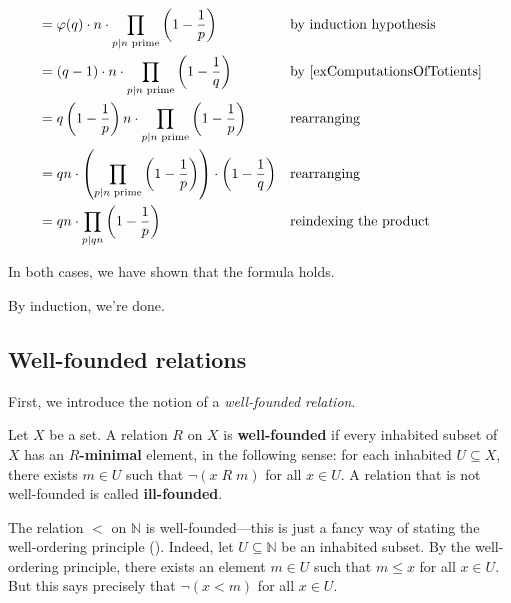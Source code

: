 \begin{cproof}
\begin{itemize}
\begin{itemize}
\begin{align*}
&= \varphi(q) \cdot n \cdot \prod_{p \mid n \text{ prime}} \left( 1-\frac{1}{p} \right) && \text{by induction hypothesis} \\
&= (q-1) \cdot n \cdot \prod_{p \mid n \text{ prime}} \left( 1-\frac{1}{q} \right) && \text{by \Cref{exComputationsOfTotients}} \\
&= q\left( 1-\frac{1}{p} \right) n \cdot \prod_{p \mid n \text{ prime}} \left( 1-\frac{1}{p} \right) && \text{rearranging} \\
&= qn \cdot \left(\prod_{p \mid n \text{ prime}} \left( 1 - \frac{1}{p} \right)\right) \cdot \left( 1 - \frac{1}{q} \right) && \text{rearranging} \\
&= qn \cdot \prod_{p \mid qn} \left( 1 - \frac{1}{p} \right) && \text{reindexing the product}
\end{align*}
\end{itemize}
In both cases, we have shown that the formula holds.
\end{itemize}
By induction, we're done.
\end{cproof}

\subsection*{Well-founded relations}

First, we introduce the notion of a \textit{well-founded relation}.

\begin{definition}
\label{defWellFoundedRelation}
Let $X$ be a set. A relation $R$ on $X$ is \textbf{well-founded} if every inhabited subset of $X$ has an \textbf{$R$-minimal} element, in the following sense: for each inhabited $U \subseteq X$, there exists $m \in U$ such that $\neg (x\;R\;m)$ for all $x \in U$. A relation that is not well-founded is called \textbf{ill-founded}.
\end{definition}

\begin{example}
\label{exNIsWellFounded}
The relation $<$ on $\mathbb{N}$ is well-founded---this is just a fancy way of stating the well-ordering principle (). Indeed, let $U \subseteq \mathbb{N}$ be an inhabited subset. By the well-ordering principle, there exists an element $m \in U$ such that $m \le x$ for all $x \in U$. But this says precisely that $\neg (x < m)$ for all $x \in U$.
\end{example}

